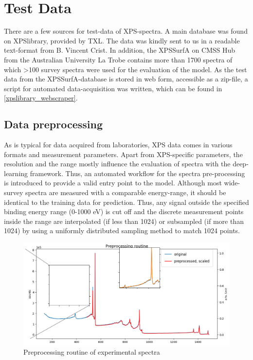 \label{test_data}
\section{Test Data}

There are a few sources for test-data of XPS-spectra. A main database was found on XPSlibrary, provided by TXL. The data was kindly sent to us in a readable text-format from B. Vincent Crist. 
In addition, the XPSSurfA on CMSS Hub from the Australian University La Trobe contains more than 1700 spectra of which >100 survey spectra were used for the evaluation of the model. As the test data from the XPSSurfA-database is stored in web form, accessible as a zip-file, a script for automated data-acquisition was written, which can be found in \ref{xpslibrary_webscraper}.

\subsection{Data preprocessing}

As is typical for data acquired from laboratories, XPS data comes in various formats and measurement parameters. Apart from XPS-specific parameters, the resolution and the range mostly influence the evaluation of spectra with the deep-learning framework. Thus, an automated workflow for the spectra pre-processing is introduced to provide a valid entry point to the model.
Although most wide-survey spectra are measured with a comparable energy-range, it should be identical to the training data for prediction. Thus, any signal outside the specified binding energy range (0-1000 eV) is cut off and the discrete measurement points inside the range are interpolated (if less than 1024) or subsampled (if more than 1024) by using a uniformly distributed sampling method to match 1024 points.

\begin{figure}
    \centering
    \includegraphics[width=\textwidth]{Figures/preprocessing_routine.png}
    \caption{Preprocessing routine of experimental spectra}
    \label{fig:preproc_routine}
\end{figure}

